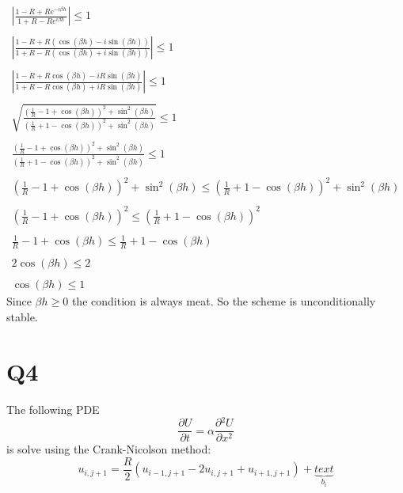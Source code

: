 \documentclass[11pt, a4paper]{article}
\newcommand{\parder}[2]{\frac{\partial {#1}}{\partial {#2}}}
\begin{document}
\begin{equation}
    \begin{array}{c}
        \left|\displaystyle \frac{1-R+Re^{-i\beta h}}{1+R-Re^{i\beta h}}\right|\le1 \\\\
        \left|\displaystyle \frac{1-R+R\left(\cos\left(\beta h\right)-i\sin\left(\beta h\right)\right)}{1+R-R\left(\cos\left(\beta h\right)+i\sin\left(\beta h\right)\right)}\right|\le1 \\\\
        \left|\displaystyle \frac{1-R+R\cos\left(\beta h\right)-iR\sin\left(\beta h\right)}{1+R-R\cos\left(\beta h\right)+iR\sin\left(\beta h\right)}\right|\le1 \\\\
        \displaystyle\sqrt{\frac{\displaystyle\left(\frac{1}{R}-1+\cos\left(\beta h\right)\right)^2+\sin^2\left(\beta h\right)}{\displaystyle\left(\frac{1}{R}+1-\cos\left(\beta h\right)\right)^2+\sin^2\left(\beta h\right)}}\le1 \\\\
        \displaystyle\frac{\displaystyle\left(\frac{1}{R}-1+\cos\left(\beta h\right)\right)^2+\sin^2\left(\beta h\right)}{\displaystyle\left(\frac{1}{R}+1-\cos\left(\beta h\right)\right)^2+\sin^2\left(\beta h\right)}\le1 \\\\
        \displaystyle \left(\frac{1}{R}-1+\cos\left(\beta h\right)\right)^2+\sin^2\left(\beta h\right)\le\displaystyle \left(\frac{1}{R}+1-\cos\left(\beta h\right)\right)^2+\sin^2\left(\beta h\right) \\\\
        \displaystyle \left(\frac{1}{R}-1+\cos\left(\beta h\right)\right)^2\le\displaystyle \left(\frac{1}{R}+1-\cos\left(\beta h\right)\right)^2 \\\\
        \displaystyle \frac{1}{R}-1+\cos\left(\beta h\right)\le\frac{1}{R}+1-\cos\left(\beta h\right) \\\\
        \displaystyle 2\cos\left(\beta h\right)\le2 \\\\
        \displaystyle \cos\left(\beta h\right)\le1
    \end{array}
\end{equation}
Since $\beta h\ge0$ the condition is always meat. So the scheme is unconditionally stable.

\section{Q4}
The following PDE
\begin{equation}
    \parder{U}{t}=\alpha\parder{^2U}{x^2}
\end{equation}
is solve using the Crank-Nicolson method:
\begin{equation}
    u_{i,j+1}=\frac{R}{2}\left(u_{i-1,j+1}-2u_{i,j+1}+u_{i+1,j+1}\right)+\underbrace{text}_{b_i}
\end{equation}
\end{document}
